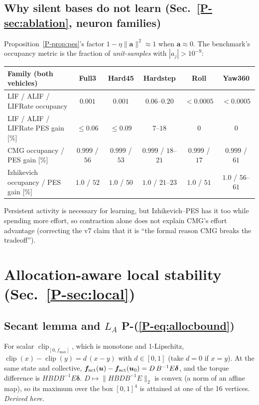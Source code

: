 \documentclass[11pt]{article}
\newcommand{\srcroot}{../../..}
\newcommand{\clip}{\operatorname{clip}}
\newcommand{\PE}[1]{P-(\ref{P-#1})}          %
\newcommand{\PT}[1]{\ref{P-#1}}               %
\newcommand{\code}[1]{\texttt{\detokenize{#1}}}
\theoremstyle{remark}
\newcommand{\listing}[4]{%
  }
\begin{document}
\subsection{Why silent bases do not learn (Sec.~\PT{sec:ablation}, neuron families)}
Proposition~\PT{prop:pes}'s factor $1-\eta\|\bm a\|^2\approx1$ when $\bm a\approx0$. The benchmark's occupancy
metric is the fraction of \emph{unit-samples} with $|a_j|>10^{-9}$:
\listing{experiments/nengo_nef_replication_2026-08-29/compile_neuron_family_benchmark.py}{86}{93}{occupancy, drift, update RMS}
\begin{center}\small
\begin{tabular}{@{}lccccc@{}}
\toprule
Family (both vehicles) & Full3 & Hard45 & Hardstep & Roll & Yaw360\\\midrule
LIF / ALIF / LIFRate occupancy & $0.001$ & $0.001$ & $0.06$--$0.20$ & $<0.0005$ & $<0.0005$\\
LIF / ALIF / LIFRate PES gain [\%] & $\le0.06$ & $\le0.09$ & $7$--$18$ & $0$ & $0$\\
CMG occupancy / PES gain [\%] & $0.999$ / $56$ & $0.999$ / $53$ & $0.999$ / $18$--$21$ & $0.999$ / $17$ & $0.999$ / $61$\\
Izhikevich occupancy / PES gain [\%] & $1.0$ / $52$ & $1.0$ / $50$ & $1.0$ / $21$--$23$ & $1.0$ / $51$ & $1.0$ / $56$--$61$\\
\bottomrule
\end{tabular}
\end{center}
Persistent activity is necessary for learning, but Izhikevich--PES has it too while spending more effort,
so contraction alone does not explain CMG's effort advantage (correcting the v7 claim that it is ``the
formal reason CMG breaks the tradeoff'').

\section{Allocation-aware local stability (Sec.~\PT{sec:local})}\label{sec:local}
\subsection{Secant lemma and $L_A$ \PE{eq:allocbound}}\label{sec:secant}
For scalar $\clip_{[0,f_{\max}]}$, which is monotone and 1-Lipschitz,
$\clip(x)-\clip(y)=d\,(x-y)$ with $d\in[0,1]$ (take $d=0$ if $x=y$). At the same state and collective,
$\bm f_{\rm act}(\bm u)-\bm f_{\rm act}(\bm u_0)=D\,B^{-1}E\bm\delta$, and the torque difference is
$HBDB^{-1}E\bm\delta$. $D\mapsto\|HBDB^{-1}E\|_2$ is convex (a norm of an affine map), so its maximum over
the box $[0,1]^4$ is attained at one of the 16 vertices. \emph{Derived here.}
\end{document}
